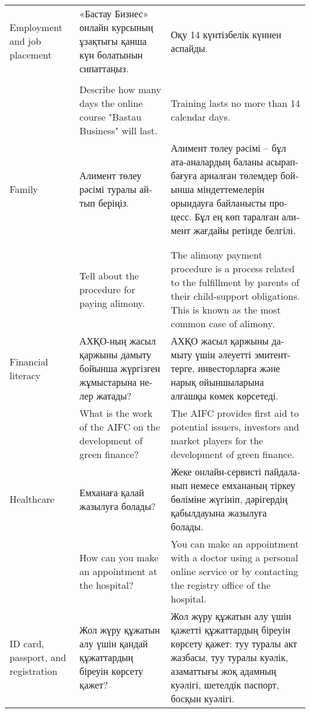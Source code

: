\begin{table*}[ht!]
{\begin{tabular}{p{}p{}p{}}
Employment and job placement & \foreignlanguage{russian}{ «Бастау Бизнес» онлайн курсының ұзақтығы қанша күн болатынын сипаттаңыз. } & \foreignlanguage{russian}{ Оқу 14 күнтізбелік күннен аспайды. } \\ 
\\
 & Describe how many days the online course "Bastau Business" will last. & Training lasts no more than 14 calendar days.  \\
\midrule
Family & \foreignlanguage{russian}{ Алимент төлеу рәсімі туралы айтып беріңіз. } & \foreignlanguage{russian}{ Алимент төлеу рәсімі – бұл ата-аналардың баланы асырап-бағуға арналған төлемдер бойынша міндеттемелерін орындауға байланысты процесс. Бұл ең көп таралған алимент жағдайы ретінде белгілі. } \\ 
\\
\\
 & Tell about the procedure for paying alimony. & The alimony payment procedure is a process related to the fulfillment by parents of their child-support obligations. This is known as the most common case of alimony.  \\
\midrule

Financial literacy & \foreignlanguage{russian}{ АХҚО-ның жасыл қаржыны дамыту бойынша жүргізген жұмыстарына нелер жатады? } & \foreignlanguage{russian}{ АХҚО жасыл қаржыны дамыту үшін әлеуетті эмитенттерге, инвесторларға және нарық ойыншыларына алғашқы көмек көрсетеді. } \\ 

 & What is the work of the AIFC on the development of green finance? & The AIFC provides first aid to potential issuers, investors and market players for the development of green finance.  \\
\midrule
Healthcare & \foreignlanguage{russian}{ Емханаға қалай жазылуға болады? } & \foreignlanguage{russian}{ Жеке онлайн-сервисті пайдаланып немесе емхананың тіркеу бөліміне жүгініп, дәрігердің қабылдауына жазылуға болады. } \\

 & How can you make an appointment at the hospital? & You can make an appointment with a doctor using a personal online service or by contacting the registry office of the hospital.  \\ 
\midrule

ID card, passport, and registration & \foreignlanguage{russian}{ Жол жүру құжатын алу үшін қандай құжаттардың біреуін көрсету қажет? } & \foreignlanguage{russian}{ Жол жүру құжатын алу үшін қажетті құжаттардың біреуін көрсету қажет: туу туралы акт жазбасы, туу туралы куәлік, азаматтығы жоқ адамның куәлігі, шетелдік паспорт, босқын куәлігі. } \\ 


\end{tabular}}
\end{table*}
